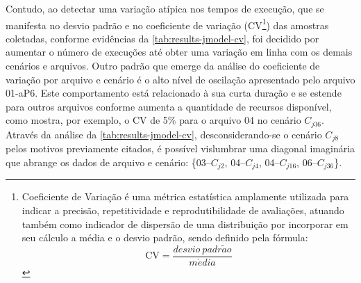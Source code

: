 \documentclass[english,brazilian]{UNISINOSmonografia} %
\begin{document}
Contudo, ao detectar uma variação atípica nos tempos de execução, que se manifesta no desvio padrão e no coeficiente de variação (CV\footnote{
	Coeficiente de Variação é uma métrica estatística amplamente utilizada para indicar a precisão, repetitividade e reprodutibilidade de avaliações, atuando também como indicador de dispersão de uma distribuição por incorporar em seu cálculo a média e o desvio padrão, sendo definido pela fórmula:
	\[ \text{CV} = \dfrac{desvio~padr\tilde{a}o}{m\acute{e}dia} \]
}) das amostras coletadas, conforme evidências da \autoref{tab:results-jmodel-cv}, 
foi decidido por aumentar o número de execuções até obter uma variação em linha com os demais cenários e arquivos.
%
Outro padrão que emerge da análise do coeficiente de variação por arquivo e cenário é o alto nível de oscilação apresentado pelo arquivo 01-aP6.
%
Este comportamento está relacionado à sua curta duração e se estende para outros arquivos conforme aumenta a quantidade de recursos disponível, como mostra, por exemplo, o CV de 5\% para o arquivo 04 no cenário $C_{j36}$.
%
Através da análise da \autoref{tab:results-jmodel-cv}, desconsiderando-se o cenário $C_{j8}$ pelos motivos previamente citados, é possível vislumbrar uma 
diagonal imaginária que abrange os dados de arquivo e cenário: \{03--$C_{j2}$, 04--$C_{j4}$, 04--$C_{j16}$, 06--$C_{j36}$\}.
\end{document}
